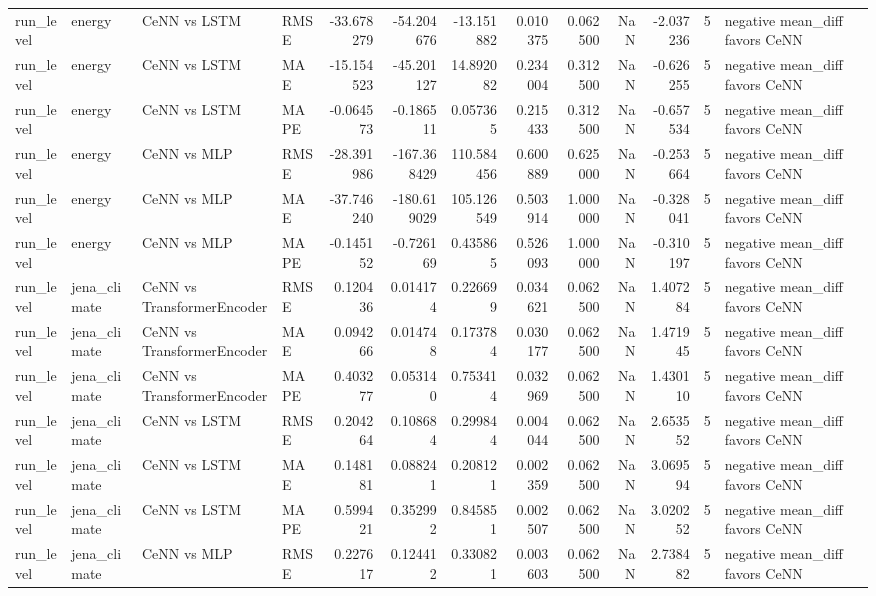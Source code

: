 \begin{tabular}{llllrrrrrrrrl}
run_level & energy & CeNN vs LSTM & RMSE & -33.678279 & -54.204676 & -13.151882 & 0.010375 & 0.062500 & NaN & -2.037236 & 5 & negative mean_diff favors CeNN \\
run_level & energy & CeNN vs LSTM & MAE & -15.154523 & -45.201127 & 14.892082 & 0.234004 & 0.312500 & NaN & -0.626255 & 5 & negative mean_diff favors CeNN \\
run_level & energy & CeNN vs LSTM & MAPE & -0.064573 & -0.186511 & 0.057365 & 0.215433 & 0.312500 & NaN & -0.657534 & 5 & negative mean_diff favors CeNN \\
run_level & energy & CeNN vs MLP & RMSE & -28.391986 & -167.368429 & 110.584456 & 0.600889 & 0.625000 & NaN & -0.253664 & 5 & negative mean_diff favors CeNN \\
run_level & energy & CeNN vs MLP & MAE & -37.746240 & -180.619029 & 105.126549 & 0.503914 & 1.000000 & NaN & -0.328041 & 5 & negative mean_diff favors CeNN \\
run_level & energy & CeNN vs MLP & MAPE & -0.145152 & -0.726169 & 0.435865 & 0.526093 & 1.000000 & NaN & -0.310197 & 5 & negative mean_diff favors CeNN \\
run_level & jena_climate & CeNN vs TransformerEncoder & RMSE & 0.120436 & 0.014174 & 0.226699 & 0.034621 & 0.062500 & NaN & 1.407284 & 5 & negative mean_diff favors CeNN \\
run_level & jena_climate & CeNN vs TransformerEncoder & MAE & 0.094266 & 0.014748 & 0.173784 & 0.030177 & 0.062500 & NaN & 1.471945 & 5 & negative mean_diff favors CeNN \\
run_level & jena_climate & CeNN vs TransformerEncoder & MAPE & 0.403277 & 0.053140 & 0.753414 & 0.032969 & 0.062500 & NaN & 1.430110 & 5 & negative mean_diff favors CeNN \\
run_level & jena_climate & CeNN vs LSTM & RMSE & 0.204264 & 0.108684 & 0.299844 & 0.004044 & 0.062500 & NaN & 2.653552 & 5 & negative mean_diff favors CeNN \\
run_level & jena_climate & CeNN vs LSTM & MAE & 0.148181 & 0.088241 & 0.208121 & 0.002359 & 0.062500 & NaN & 3.069594 & 5 & negative mean_diff favors CeNN \\
run_level & jena_climate & CeNN vs LSTM & MAPE & 0.599421 & 0.352992 & 0.845851 & 0.002507 & 0.062500 & NaN & 3.020252 & 5 & negative mean_diff favors CeNN \\
run_level & jena_climate & CeNN vs MLP & RMSE & 0.227617 & 0.124412 & 0.330821 & 0.003603 & 0.062500 & NaN & 2.738482 & 5 & negative mean_diff favors CeNN \\

\end{tabular}
